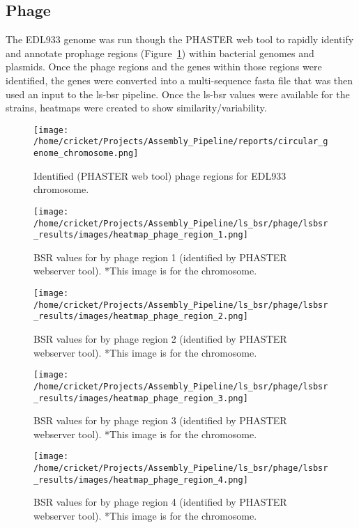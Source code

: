 \documentclass[11pt]{article}
\begin{document}
\subsection*{Phage}
The EDL933 genome was run though the PHASTER web tool to rapidly identify and annotate prophage regions (Figure~\ref{phage_regions}) within bacterial genomes and plasmids. Once the phage regions and the genes within those regions were identified, the genes were converted into a multi-sequence fasta file that was then used an input to the ls-bsr pipeline. Once the ls-bsr values were available for the strains, heatmaps were created to show similarity/variability. 

\begin{figure}[ht!]\normalsize %
\centering
\texttt{[image: /home/cricket/Projects/Assembly\_Pipeline/reports/circular\_genome\_chromosome.png]}
\caption{Identified (PHASTER web  tool) phage regions for EDL933 chromosome.}
\label{phage_regions}
\end{figure}

\begin{figure}[ht!]\normalsize %
\centering
\texttt{[image: /home/cricket/Projects/Assembly\_Pipeline/ls\_bsr/phage/lsbsr\_results/images/heatmap\_phage\_region\_1.png]} 
\caption{BSR values for by phage region 1 (identified by PHASTER webserver tool). *This image is for the chromosome.}
\label{phage_1}
\end{figure}

\clearpage

\begin{figure}[ht!]\normalsize %
\centering
\texttt{[image: /home/cricket/Projects/Assembly\_Pipeline/ls\_bsr/phage/lsbsr\_results/images/heatmap\_phage\_region\_2.png]} 
\caption{BSR values for by phage region 2 (identified by PHASTER webserver tool). *This image is for the chromosome.}
\label{phage_2}
\end{figure}

\begin{figure}[ht!]\normalsize %
\centering
\texttt{[image: /home/cricket/Projects/Assembly\_Pipeline/ls\_bsr/phage/lsbsr\_results/images/heatmap\_phage\_region\_3.png]} 
\caption{BSR values for by phage region 3 (identified by PHASTER webserver tool). *This image is for the chromosome.}
\label{phage_3}
\end{figure}

\clearpage

\begin{figure}[ht!]\normalsize %
\centering
\texttt{[image: /home/cricket/Projects/Assembly\_Pipeline/ls\_bsr/phage/lsbsr\_results/images/heatmap\_phage\_region\_4.png]} 
\caption{BSR values for by phage region 4 (identified by PHASTER webserver tool). *This image is for the chromosome.}
\label{phage_4}
\end{figure}
\end{document}
